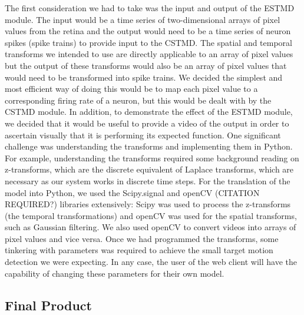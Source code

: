 \documentclass[a4paper,11pt]{article}
\begin{document}
The first consideration we had to take was the input and output of the ESTMD module. The input would be a time series of two-dimensional arrays of pixel values from the retina and the output would need to be a time series of neuron spikes (spike trains) to provide input to the CSTMD. The spatial and temporal transforms we intended to use are directly applicable to an array of pixel values but the output of these transforms would also be an array of pixel values that would need to be transformed into spike trains. We decided the simplest and most efficient way of doing this would be to map each pixel value to a corresponding firing rate of a neuron, but this would be dealt with by the CSTMD module. In addition, to demonstrate the effect of the ESTMD module, we decided that it would be useful to provide a video of the output in order to ascertain visually that it is performing its expected function.
\newline
\newline
One significant challenge was understanding the transforms and implementing them in Python. For example, understanding the transforms required some background reading on z-transforms, which are the discrete equivalent of Laplace transforms, which are necessary as our system works in discrete time steps. For the translation of the model into Python, we used the Scipy.signal and openCV (CITATION REQUIRED?) libraries extensively: Scipy was used to process the z-transforms (the temporal transformations) and openCV was used for the spatial transforms, such as Gaussian filtering. We also used openCV to convert videos into arrays of pixel values and vice versa.
\newline
\newline
Once we had programmed the transforms, some tinkering with parameters was required to achieve the small target motion detection we were expecting. In any case, the user of the web client will have the capability of changing these parameters for their own model.

\subsection{Final Product}
\end{document}
